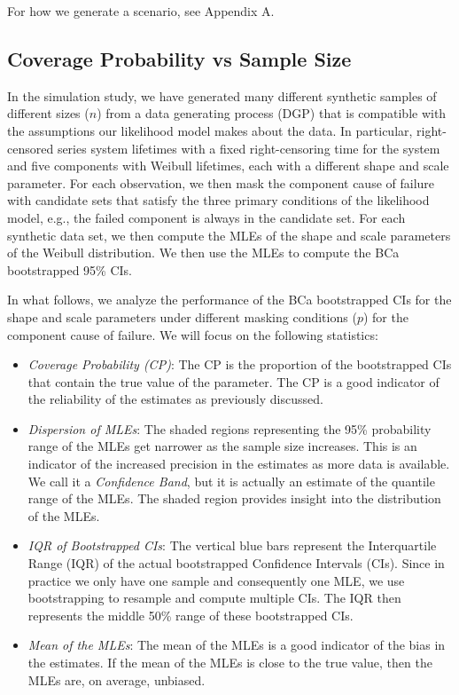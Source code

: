 \documentclass[
]{article}
\begin{document}
For how we generate a scenario, see Appendix A.

\hypertarget{coverage-probability-vs-sample-size}{%
\subsection{Coverage Probability vs Sample
Size}\label{coverage-probability-vs-sample-size}}

In the simulation study, we have generated many different synthetic
samples of different sizes (\(n\)) from a data generating process (DGP)
that is compatible with the assumptions our likelihood model makes about
the data. In particular, right-censored series system lifetimes with a
fixed right-censoring time for the system and five components with
Weibull lifetimes, each with a different shape and scale parameter. For
each observation, we then mask the component cause of failure with
candidate sets that satisfy the three primary conditions of the
likelihood model, e.g., the failed component is always in the candidate
set. For each synthetic data set, we then compute the MLEs of the shape
and scale parameters of the Weibull distribution. We then use the MLEs
to compute the BCa bootstrapped 95\% CIs.

In what follows, we analyze the performance of the BCa bootstrapped CIs
for the shape and scale parameters under different masking conditions
(\(p\)) for the component cause of failure. We will focus on the
following statistics:

\begin{itemize}
\item
  \emph{Coverage Probability (CP)}: The CP is the proportion of the
  bootstrapped CIs that contain the true value of the parameter. The CP
  is a good indicator of the reliability of the estimates as previously
  discussed.
\item
  \emph{Dispersion of MLEs}: The shaded regions representing the 95\%
  probability range of the MLEs get narrower as the sample size
  increases. This is an indicator of the increased precision in the
  estimates as more data is available. We call it a \emph{Confidence
  Band}, but it is actually an estimate of the quantile range of the
  MLEs. The shaded region provides insight into the distribution of the
  MLEs.
\item
  \emph{IQR of Bootstrapped CIs}: The vertical blue bars represent the
  Interquartile Range (IQR) of the actual bootstrapped Confidence
  Intervals (CIs). Since in practice we only have one sample and
  consequently one MLE, we use bootstrapping to resample and compute
  multiple CIs. The IQR then represents the middle 50\% range of these
  bootstrapped CIs.
\item
  \emph{Mean of the MLEs}: The mean of the MLEs is a good indicator of
  the bias in the estimates. If the mean of the MLEs is close to the
  true value, then the MLEs are, on average, unbiased.
\end{itemize}
\end{document}
